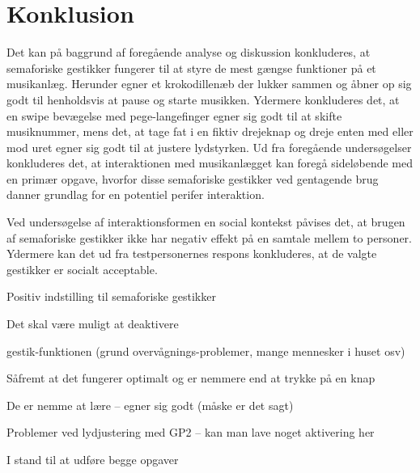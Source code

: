 \chapter{Konklusion}
\label{Konklusion}
%
Det kan på baggrund af foregående analyse og diskussion konkluderes, at semaforiske gestikker fungerer til at styre de mest gængse funktioner på et musikanlæg. Herunder egner et krokodillenæb der lukker sammen og åbner op sig godt til henholdsvis at pause og starte musikken. Ydermere konkluderes det, at en swipe bevægelse med pege-langefinger egner sig godt til at skifte musiknummer, mens det, at tage fat i en fiktiv drejeknap og dreje enten med eller mod uret egner sig godt til at justere lydstyrken. Ud fra foregående undersøgelser konkluderes det, at interaktionen med musikanlægget kan foregå sideløbende med en primær opgave, hvorfor disse semaforiske gestikker ved gentagende brug danner grundlag for en potentiel perifer interaktion. 

Ved undersøgelse af interaktionsformen en social kontekst påvises det, at brugen af semaforiske gestikker ikke har negativ effekt på en samtale mellem to personer. Ydermere kan det ud fra testpersonernes respons konkluderes, at de valgte gestikker er socialt acceptable. 

Positiv indstilling til semaforiske gestikker

Det skal være muligt at deaktivere 

gestik-funktionen (grund overvågnings-problemer, mange mennesker i huset osv) 

Såfremt at det fungerer optimalt og er nemmere end at trykke på en knap

De er nemme at lære – egner sig godt (måske er det sagt)

Problemer ved lydjustering med GP2 – kan man lave noget aktivering her 

I stand til at udføre begge opgaver
